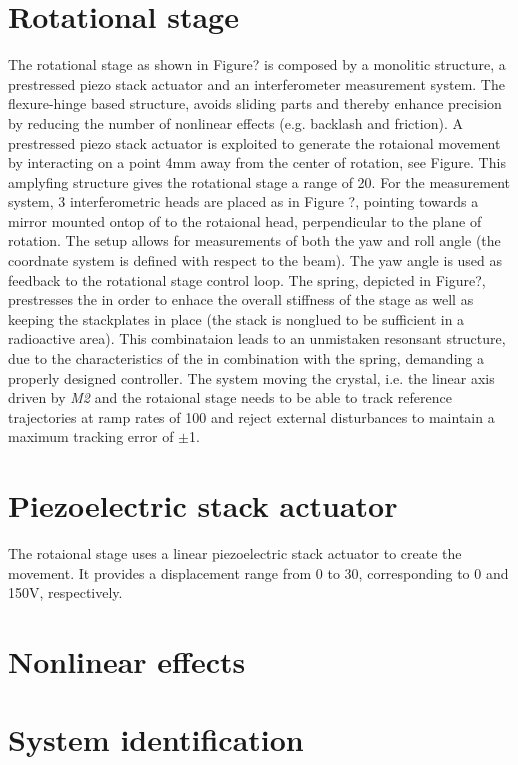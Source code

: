 \section{Rotational stage}
The rotational stage as shown in Figure? is composed by a monolitic structure, a prestressed piezo stack actuator and an interferometer measurement system. The flexure-hinge based structure, avoids sliding parts and thereby enhance precision by reducing the number of nonlinear effects (e.g. backlash and friction). A prestressed piezo stack actuator is exploited to generate the rotaional movement by interacting on a point 4mm away from the center of rotation, see Figure. This amplyfing structure gives the rotational stage a range of \unit{20}{\milli\rad}. For the measurement system, 3 interferometric heads are placed as in Figure ?, pointing towards a mirror mounted ontop of to the rotaional head, perpendicular to the plane of rotation. The setup allows for measurements of both the yaw and roll angle (the coordnate system is defined with respect to the beam). The yaw angle is used as feedback to the rotational stage control loop. The spring, depicted in Figure?, prestresses the \abbrPESA in order to enhace the overall stiffness of the stage as well as keeping the stackplates in place (the stack is nonglued to be sufficient in a radioactive area). This combinataion leads to an unmistaken resonsant structure, due to the characteristics of the \abbrPESAdemanding in combination with the spring, demanding a properly designed controller. The system moving the crystal, i.e. the linear axis driven by \emph{M2} and the rotaional stage needs to be able to track reference trajectories at ramp rates of \unit{100}{\micro\radianpersecond} and reject external disturbances to maintain a maximum tracking error of $\pm$\unit{1}{\micro\rad}.

\section{Piezoelectric stack actuator}
The rotaional stage uses a linear piezoelectric stack actuator to create the movement. It provides a displacement range from 0 to \unit{30}{\micro\meter}, corresponding to 0 and 150V, respectively. 

\section{Nonlinear effects}

\section{System identification}
